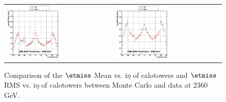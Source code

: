 \begin{figure}[h!]
 \centering
 \begin{tabular}{ll}
  \includegraphics[width=0.5\textwidth]{plots_DataVsMC_MB_2360GeV/g_calometPtMean_vs_ieta_2360.eps} &
  \includegraphics[width=0.5\textwidth]{plots_DataVsMC_MB_2360GeV/g_calometPtRMS_vs_ieta_2360.eps} \\
 \end{tabular}
 \caption{\small Comparison of the $\etmiss$ Mean vs. i$\eta$ of calotowers and $\etmiss$ RMS vs. i$\eta$ of calotowers between 
          Monte Carlo and data at $2360$ GeV.\label{fig:MET_MeanRMS_vs_ieta_2360}}
\end{figure}

